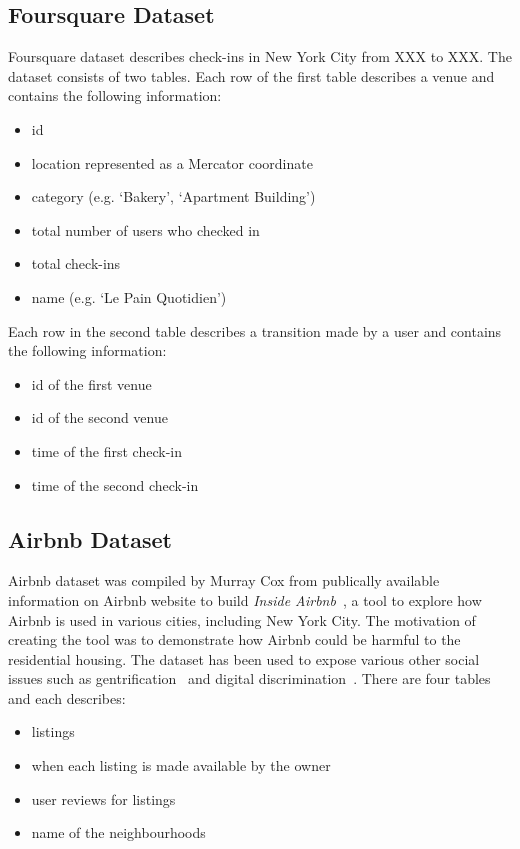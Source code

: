 \subsection{Foursquare Dataset}
Foursquare dataset describes check-ins in New York City from \color{red} XXX to XXX.\color{black} 
The dataset consists of two tables.
Each row of the first table describes a venue and contains the following information:
\begin{itemize}
\item id
\item location represented as a Mercator coordinate
\item category (e.g. `Bakery', `Apartment Building')
\item total number of users who checked in
\item total check-ins
\item name (e.g. `Le Pain Quotidien')
\end{itemize}
Each row in the second table describes a transition made by a user and contains the following information:
\begin{itemize}
\item id of the first venue 
\item id of the second venue
\item time of the first check-in
\item time of the second check-in
\end{itemize}
\subsection{Airbnb Dataset}
Airbnb dataset was compiled by Murray Cox from publically available information on Airbnb website to build \emph{Inside Airbnb}~\citep{insideairbnb}, a tool to explore how Airbnb is used in various cities, including New York City.
The motivation of creating the tool was to demonstrate how Airbnb could be harmful to the residential housing.
The dataset has been used to expose various other social issues such as gentrification~\citep{gentrification} and digital discrimination~\citep{edelman2014digital}.
There are four tables and each describes:
\begin{itemize}
\item listings
\item when each listing is made available by the owner
\item user reviews for listings
\item name of the neighbourhoods
\end{itemize}